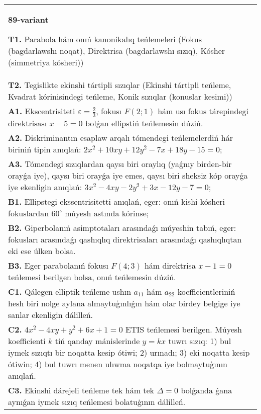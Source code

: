 \documentclass{article}
\begin{document}
\begin{tabular}{m{17cm}}
\textbf{89-variant}
\newline

\textbf{T1.} Parabola hám onıń kanonikalıq teńlemeleri (Fokus (bagdarlawshı noqat), Direktrisa (bagdarlawshı sızıq), Kósher (simmetriya kósheri)) \\
\textbf{T2.} Tegislikte ekinshi tártipli sızıqlar (Ekinshi tártipli teńleme, Kvadrat kórinisindegi teńleme, Konik sızıqlar (konuslar kesimi)) \\
\textbf{A1.} Ekscentrisiteti $\varepsilon=\frac{2}{3}$, fokusı $F (2; 1) $ hám usı fokus tárepindegi direktrisası $x-5=0$ bolǵan ellipstiń teńlemesin dúziń. \\
\textbf{A2.} Diskriminantın esaplaw arqalı tómendegi teńlemelerdiń hár biriniń tipin anıqlań: $2 x^2+10 x y+12 y^2-7 x+18 y-15=0$; \\
\textbf{A3.} Tómendegi sızıqlardan qaysı biri oraylıq (yaǵnıy birden-bir orayǵa iye), qaysı biri orayǵa iye emes, qaysı biri sheksiz kóp orayǵa iye ekenligin anıqlań: $3 x^2-4 x y-2 y^2+3 x-12 y-7=0$; \\
\textbf{B1.} Ellipstegi ekssentrisitetti anıqlań, eger: onıń kishi kósheri fokuslardan $60^{\circ}$ múyesh astında kórinse; \\
\textbf{B2.} Giperbolanıń asimptotaları arasındaǵı múyeshin tabıń, eger: fokusları arasındaǵı qashıqlıq direktrisaları arasındaǵı qashıqlıqtan eki ese úlken bolsa. \\
\textbf{B3.} Eger parabolanıń fokusı $F (4;3) $ hám direktrisa $x-1=0$ teńlemesi berilgen bolsa, onıń teńlemesin dúziń. \\
\textbf{C1.} Qálegen elliptik teńleme ushın $a_{11}$ hám $a_{22}$ koefficientleriniń hesh biri nolge aylana almaytuģınlıǵın hám olar birdey belgige iye sanlar ekenligin dálilleń. \\
\textbf{C2.} $4 x^2-4 x y+y^2+6 x+1=0$ ETIS teńlemesi berilgen. Múyesh koefficienti $k$ tiń qanday mánislerinde $y=kx$ tuwrı sızıq: 1) bul iymek sızıqtı bir noqatta kesip ótiwi; 2) urınadı; 3) eki noqatta kesip ótiwin; 4) bul tuwrı menen ulıwma noqatqa iye bolmaytuģının anıqlań. \\
\textbf{C3.} Ekinshi dárejeli teńleme tek hám tek $\Delta=0$ bolǵanda ǵana aynıǵan iymek sızıq teńlemesi bolatuģının dálilleń. \\

\end{tabular}
\vspace{1cm}
\end{document}
